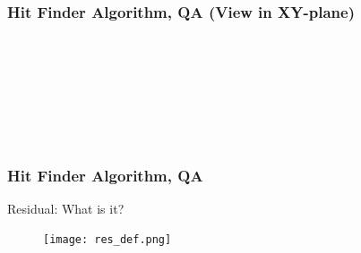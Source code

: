 \documentclass[svgnames] {beamer}
\begin{document}

\begin{frame}
	\frametitle{Hit Finder Algorithm, QA (View in XY-plane)}
	\begin{figure}[H]
		\centering
		\begin{minipage}[h]{0.3\linewidth}
			\\	
		\end{minipage}
		\begin{minipage}[h]{0.3\linewidth}
			\\
		\end{minipage}
		\vfill
		\begin{minipage}[h]{0.3\linewidth}
			\\
		\end{minipage}
		\begin{minipage}[h]{0.3\linewidth}
			\\
		\end{minipage}
	\end{figure}
\end{frame}

\begin{frame}
	\frametitle{Hit Finder Algorithm, QA}
	\begin{block}{}
		\centering Residual: What is it?
	\end{block}
	\begin{figure}[H]
		\texttt{[image: res\_def.png]}
	\end{figure}
\end{frame}
\end{document}
